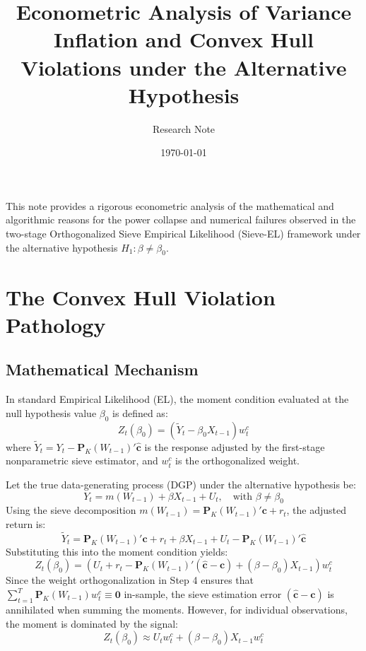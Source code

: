 \documentclass[12pt]{article}
\title{Econometric Analysis of Variance Inflation and Convex Hull Violations under the Alternative Hypothesis}
\author{Research Note}
\date{\today}
\begin{document}
\maketitle

This note provides a rigorous econometric analysis of the mathematical and algorithmic reasons for the power collapse and numerical failures observed in the two-stage Orthogonalized Sieve Empirical Likelihood (Sieve-EL) framework under the alternative hypothesis $H_1: \beta \neq \beta_0$.

\section{The Convex Hull Violation Pathology}

\subsection{Mathematical Mechanism}
In standard Empirical Likelihood (EL), the moment condition evaluated at the null hypothesis value $\beta_0$ is defined as:
\begin{equation}
    Z_t(\beta_0) = \left( \widetilde{Y}_t - \beta_0 X_{t-1} \right) w^c_t
\end{equation}
where $\widetilde{Y}_t = Y_t - \bm{P}_K(W_{t-1})'\widehat{\bm{c}}$ is the response adjusted by the first-stage nonparametric sieve estimator, and $w^c_t$ is the orthogonalized weight.

Let the true data-generating process (DGP) under the alternative hypothesis be:
\begin{equation}
    Y_t = m(W_{t-1}) + \beta X_{t-1} + U_t, \quad \text{with } \beta \neq \beta_0
\end{equation}
Using the sieve decomposition $m(W_{t-1}) = \bm{P}_K(W_{t-1})'\bm{c} + r_t$, the adjusted return is:
\begin{equation}
    \widetilde{Y}_t = \bm{P}_K(W_{t-1})'\bm{c} + r_t + \beta X_{t-1} + U_t - \bm{P}_K(W_{t-1})'\widehat{\bm{c}}
\end{equation}
Substituting this into the moment condition yields:
\begin{equation}
    Z_t(\beta_0) = \left( U_t + r_t - \bm{P}_K(W_{t-1})'(\widehat{\bm{c}} - \bm{c}) + (\beta - \beta_0) X_{t-1} \right) w^c_t
\end{equation}
Since the weight orthogonalization in Step 4 ensures that $\sum_{t=1}^T \bm{P}_K(W_{t-1}) w^c_t \equiv \bm{0}$ in-sample, the sieve estimation error $(\widehat{\bm{c}} - \bm{c})$ is annihilated when summing the moments. However, for individual observations, the moment is dominated by the signal:
\begin{equation}
    Z_t(\beta_0) \approx U_t w^c_t + (\beta - \beta_0) X_{t-1} w^c_t
\end{equation}
\end{document}

